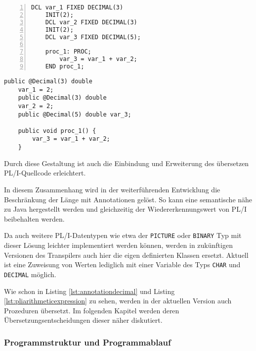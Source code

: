 \begin{minipage}[b]{0.48\linewidth}
	\centering
	\lstset{language=PL/I,label=SliceExaple}
	\begin{lstlisting}[frame=single, numbers=left, mathescape,%
		caption={Transformation DECIMAL}, label={lst:annotationdecimal}]
	DCL var_1 FIXED DECIMAL(3)
	INIT(2);
	DCL var_2 FIXED DECIMAL(3) 
	INIT(2);
	DCL var_3 FIXED DECIMAL(5);
		
	proc_1: PROC;
		var_3 = var_1 + var_2;
	END proc_1;
	\end{lstlisting}
\end{minipage}
\hspace{0.5cm}
\begin{minipage}[b]{0.48\linewidth}
	\centering
	\lstset{language=Java,label=SliceExaple}
	\begin{lstlisting}[frame=single, mathescape,%
		title={" "}]
	public @Decimal(3) double 
	var_1 = 2;
	public @Decimal(3) double 
	var_2 = 2;
	public @Decimal(5) double var_3;
		
	public void proc_1() {
		var_3 = var_1 + var_2;
	}
	\end{lstlisting}
\end{minipage}

Durch diese Gestaltung ist auch die Einbindung und Erweiterung des übersetzen PL/I-Quellcode erleichtert.

In diesem Zusammenhang wird in der weiterführenden Entwicklung die Beschränkung der Länge mit Annotationen gelöst. So kann eine semantische nähe zu Java hergestellt werden und gleichzeitig der Wiedererkennungswert von PL/I beibehalten werden.

Da auch weitere PL/I-Datentypen wie etwa der \verb+PICTURE+ oder \verb+BINARY+ Typ mit dieser Lösung leichter implementiert werden können, werden in zukünftigen Versionen des Transpilers auch hier die eigen definierten Klassen ersetzt.
Aktuell ist eine Zuweisung von Werten lediglich mit einer Variable des Typs \verb+CHAR+ und \verb+DECIMAL+ möglich.

Wie schon in Listing \ref{lst:annotationdecimal} und Listing \ref{lst:pliarithmeticexpression} zu sehen, werden in der aktuellen Version auch Prozeduren übersetzt.
Im folgenden Kapitel werden deren Übersetzungsentscheidungen dieser näher diskutiert.

\pagebreak
\subsubsection{Programmstruktur und Programmablauf}
